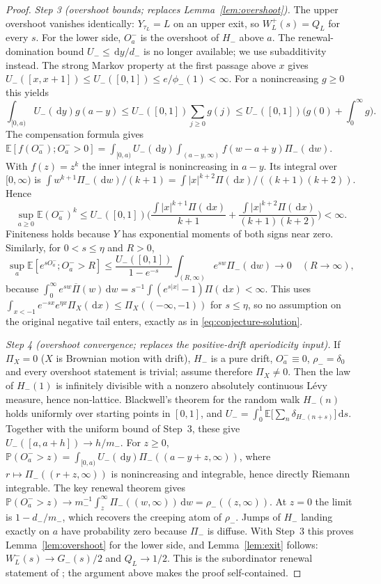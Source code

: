 \documentclass[11pt,a4paper]{article}
\theoremstyle{definition}
\theoremstyle{remark}
\newcommand{\E}{\mathbb E}
\newcommand{\Pp}{\mathbb P}
\newcommand{\1}{\mathbf 1}
\newcommand{\dd}{\,\mathrm d}
\begin{document}
\begin{proof}
\emph{Step 3 (overshoot bounds; replaces Lemma~\ref{lem:overshoot}).}
The upper overshoot vanishes identically: $Y_{\tau_L}=L$ on an upper exit, so $W_L^+(s)=Q_L$ for every $s$. For the lower side, $O_a^-$ is the overshoot of $H_-$ above $a$. The renewal-domination bound $U_-\le\dd y/d_-$ is no longer available; we use subadditivity instead. The strong Markov property at the first passage above $x$ gives $U_-([x,x+1])\le U_-([0,1])\le e/\phi_-(1)<\infty$. For a nonincreasing $g\ge0$ this yields
\[
 \int_{[0,a)}U_-(\dd y)g(a-y)\le U_-([0,1])\sum_{j\ge0}g(j)
 \le U_-([0,1])\Big(g(0)+\int_0^\infty g\Big).
\]
The compensation formula gives $\E[f(O_a^-);O_a^->0]=\int_{[0,a)}U_-(\dd y)\int_{(a-y,\infty)}f(w-a+y)\Pi_-(\dd w)$. With $f(z)=z^k$ the inner integral is nonincreasing in $a-y$. Its integral over $[0,\infty)$ is $\int w^{k+1}\Pi_-(\dd w)/(k+1)=\int|x|^{k+2}\Pi(\dd x)/((k+1)(k+2))$. Hence
\[
 \sup_{a\ge0}\E(O_a^-)^k\le U_-([0,1])\Big(\frac{\int|x|^{k+1}\Pi(\dd x)}{k+1}+\frac{\int|x|^{k+2}\Pi(\dd x)}{(k+1)(k+2)}\Big)<\infty .
\]
Finiteness holds because $Y$ has exponential moments of both signs near zero. Similarly, for $0<s\le\eta$ and $R>0$,
\[
 \sup_a\E[e^{sO_a^-};O_a^->R]\le\frac{U_-([0,1])}{1-e^{-s}}\int_{(R,\infty)}e^{sw}\Pi_-(\dd w)\longrightarrow0
 \quad(R\to\infty),
\]
because $\int_0^\infty e^{sw}\overline\Pi(w)\dd w=s^{-1}\int(e^{s|x|}-1)\Pi(\dd x)<\infty$. This uses $\int_{x<-1}e^{-sx}e^{\eta x}\Pi_X(\dd x)\le\Pi_X((-\infty,-1))$ for $s\le\eta$, so no assumption on the original negative tail enters, exactly as in \eqref{eq:conjecture-solution}.

\emph{Step 4 (overshoot convergence; replaces the positive-drift aperiodicity input).}
If $\Pi_X=0$ ($X$ is Brownian motion with drift), $H_-$ is a pure drift, $O_a^-\equiv0$, $\rho_-=\delta_0$ and every overshoot statement is trivial; assume therefore $\Pi_X\ne0$. Then the law of $H_-(1)$ is infinitely divisible with a nonzero absolutely continuous L\'evy measure, hence non-lattice. Blackwell's theorem for the random walk $H_-(n)$ holds uniformly over starting points in $[0,1]$, and $U_-=\int_0^1\E\big[\sum_n\delta_{H_-(n+s)}\big]\dd s$. Together with the uniform bound of Step~3, these give $U_-([a,a+h])\to h/m_-$. For $z\ge0$,
$\Pp(O_a^->z)=\int_{[0,a)}U_-(\dd y)\Pi_-((a-y+z,\infty))$, where $r\mapsto\Pi_-((r+z,\infty))$ is nonincreasing and integrable, hence directly Riemann integrable. The key renewal theorem gives $\Pp(O_a^->z)\to m_-^{-1}\int_z^\infty\Pi_-((w,\infty))\dd w=\rho_-((z,\infty))$. At $z=0$ the limit is $1-d_-/m_-$, which recovers the creeping atom of $\rho_-$. Jumps of $H_-$ landing exactly on $a$ have probability zero because $\Pi_-$ is diffuse. With Step~3 this proves Lemma~\ref{lem:overshoot} for the lower side, and Lemma~\ref{lem:exit} follows: $W_L^-(s)\to G_-(s)/2$ and $Q_L\to1/2$. This is the subordinator renewal statement of \cite{bvhs}; the argument above makes the proof self-contained.


\end{proof}
\end{document}
